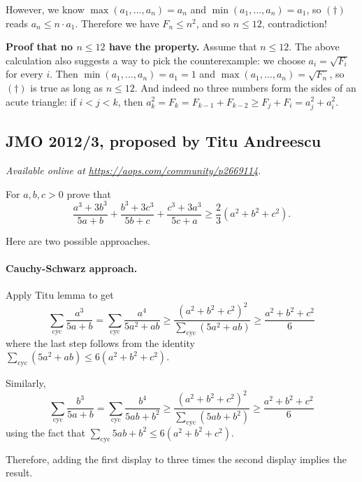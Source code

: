 \documentclass[11pt]{scrartcl}
\begin{document}
However, we know $\max(a_1, \dots, a_n) = a_n$
and $\min(a_1, \dots, a_n) = a_1$,
so $(\dagger)$ reads $a_n \le n \cdot a_1$.
Therefore we have $F_n \le n^2$, and so $n \le 12$, contradiction!

\medskip

\textbf{Proof that no $n \le 12$ have the property.}
Assume that $n \le 12$.
The above calculation also suggests a way to pick the counterexample:
we choose $a_i = \sqrt{F_i}$ for every $i$.
Then $\min(a_1, \dots, a_n) = a_1 = 1$
and $\max(a_1, \dots, a_n) = \sqrt{F_n}$,
so $(\dagger)$ is true as long as $n \le 12$.
And indeed no three numbers form the sides of an acute triangle:
if $i < j < k$,
then $a_k^2 = F_k = F_{k-1} + F_{k-2} \ge F_j + F_i = a_j^2 + a_i^2$.
\pagebreak

\subsection{JMO 2012/3, proposed by Titu Andreescu}
\textsl{Available online at \url{https://aops.com/community/p2669114}.}
\begin{mdframed}[style=mdpurplebox,frametitle={Problem statement}]
For $a,b,c > 0$ prove that
\[ \frac{a^3+3b^3}{5a+b}
  + \frac{b^3+3c^3}{5b+c}
  + \frac{c^3+3a^3}{5c+a}
  \ge \frac23(a^2+b^2+c^2).  \]
\end{mdframed}
Here are two possible approaches.

\paragraph{Cauchy-Schwarz approach.}
Apply Titu lemma to get
\[ \sum_{\text{cyc}} \frac{a^3}{5a+b}
  = \sum_{\text{cyc}} \frac{a^4}{5a^2+ab}
  \ge \frac{(a^2+b^2+c^2)^2}{\sum_{\text{cyc}} (5a^2+ab)}
  \ge \frac{a^2+b^2+c^2}{6} \]
where the last step follows
from the identity $\sum_{\text{cyc}} (5a^2+ab) \le 6(a^2+b^2+c^2)$.

Similarly,
\[ \sum_{\text{cyc}} \frac{b^3}{5a+b}
  = \sum_{\text{cyc}} \frac{b^4}{5ab+b^2}
  \ge \frac{(a^2+b^2+c^2)^2}{\sum_{\text{cyc}} (5ab+b^2)}
  \ge \frac{a^2+b^2+c^2}{6} \]
using the fact that $\sum_{\text{cyc}} 5ab+b^2 \le 6(a^2+b^2+c^2)$.

Therefore, adding the first display to
three times the second display implies the result.
\end{document}
